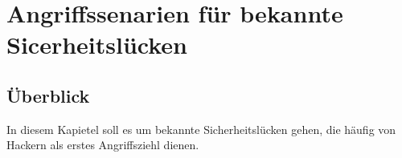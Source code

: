 \section{Angriffssenarien für bekannte Sicerheitslücken}\label{seneario_fuer_angriffe}

\subsection*{Überblick}\label{ueberblick}
In diesem Kapietel soll es um bekannte Sicherheitslücken gehen, die häufig von Hackern als erstes Angriffsziehl dienen.
